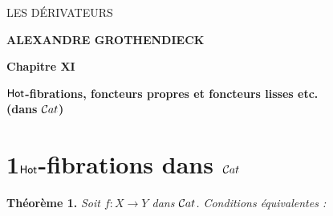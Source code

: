 \dgrchunkbegin

\printedpage{--}

\begin{center}
\vspace*{5cm}
{\LARGE\textsf{LES DÉRIVATEURS}}

\vspace{1.5em}
{\large\textbf{ALEXANDRE GROTHENDIECK}}

\vspace{3em}
{\large\textbf{Chapitre XI}}

\vspace{0.5em}
{\large $\mathsf{Hot}$\textbf{-fibrations, foncteurs propres et foncteurs lisses etc.}\\
\textbf{(dans} $\mathcal{C}at$\textbf{)}}
\end{center}

\clearpage

\printedpage{--}


\clearpage


\noindent


\section*{1\quad $\mathsf{Hot}$-fibrations dans $\mathcal{C}at$}

\noindent\textbf{Théorème 1.} \textit{Soit $f : X \longrightarrow Y$ dans} $\mathcal{C}at$\textit{. Conditions équivalentes :}

